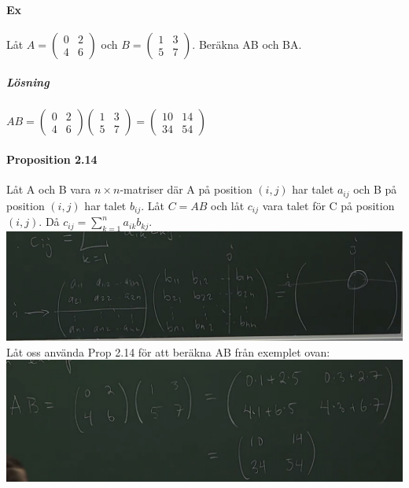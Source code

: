 \paragraph{Ex} Låt $A=\begin{pmatrix}0&2\\4&6\end{pmatrix}$ och $B=\begin{pmatrix}1&3\\5&7\end{pmatrix}$.
Beräkna AB och BA.
\subparagraph{Lösning} 
$AB=\begin{pmatrix}
    0&2\\4&6
\end{pmatrix}
\begin{pmatrix}
    1&3\\5&7
\end{pmatrix}=
\begin{pmatrix}
    10&14\\34&54
\end{pmatrix}$

\paragraph{Proposition 2.14} Låt A  och B vara $n\times n$-matriser där A på position $(i,j)$ har talet $a_{ij}$ och B på position $(i,j)$ har talet $b_{ij}$.
Låt $C=AB$ och låt $c_{ij}$ vara talet för C på position $(i,j)$.
Då $c_{ij}=\sum^{n}_{k=1}a_{ik}b_{kj}$.\\
\includegraphics[scale=0.3]{imgs/22-01-31-img01.png}\\
Låt oss använda Prop 2.14 för att beräkna AB från exemplet ovan:\\
\includegraphics[scale=0.3]{imgs/22-01-31-img02.png}\\
